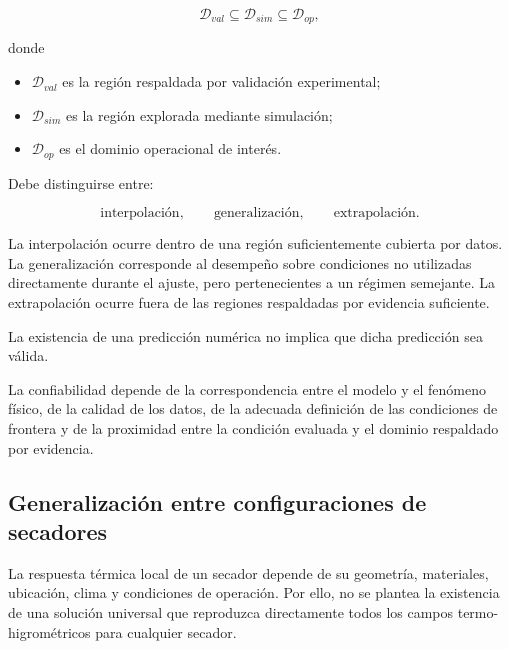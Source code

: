 \begin{equation}
\mathcal{D}_{val}
\subseteq
\mathcal{D}_{sim}
\subseteq
\mathcal{D}_{op},
\end{equation}

donde

\begin{itemize}
    \item $\mathcal{D}_{val}$ es la región respaldada por validación experimental;
    \item $\mathcal{D}_{sim}$ es la región explorada mediante simulación;
    \item $\mathcal{D}_{op}$ es el dominio operacional de interés.
\end{itemize}

Debe distinguirse entre:

\begin{equation}
\text{interpolación},
\qquad
\text{generalización},
\qquad
\text{extrapolación}.
\end{equation}

La interpolación ocurre dentro de una región suficientemente cubierta por datos. La generalización corresponde al desempeño sobre condiciones no utilizadas directamente durante el ajuste, pero pertenecientes a un régimen semejante. La extrapolación ocurre fuera de las regiones respaldadas por evidencia suficiente.

\begin{tcolorbox}[
title=Principio conceptual de validez,
colback=yellow!5,
colframe=orange!70!black,
boxrule=0.7pt,
arc=2mm
]
La existencia de una predicción numérica no implica que dicha predicción sea válida.

La confiabilidad depende de la correspondencia entre el modelo y el fenómeno físico, de la calidad de los datos, de la adecuada definición de las condiciones de frontera y de la proximidad entre la condición evaluada y el dominio respaldado por evidencia.
\end{tcolorbox}

\subsection{Generalización entre configuraciones de secadores}
\label{subsec:generalizacion_secadores}

La respuesta térmica local de un secador depende de su geometría, materiales, ubicación, clima y condiciones de operación. Por ello, no se plantea la existencia de una solución universal que reproduzca directamente todos los campos termo-higrométricos para cualquier secador.

